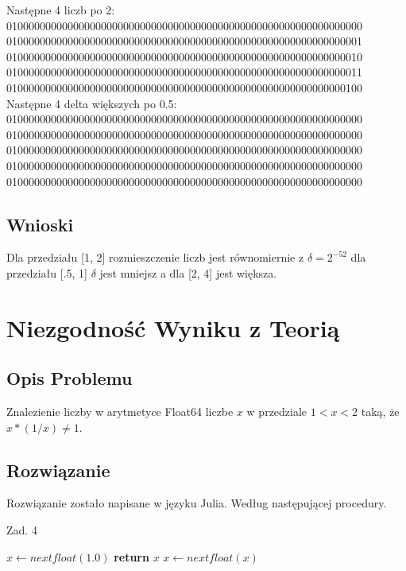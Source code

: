 \documentclass{article}
\begin{document}
Następne 4 liczb po 2:\\
0100000000000000000000000000000000000000000000000000000000000000\\
0100000000000000000000000000000000000000000000000000000000000001\\
0100000000000000000000000000000000000000000000000000000000000010\\
0100000000000000000000000000000000000000000000000000000000000011\\
0100000000000000000000000000000000000000000000000000000000000100\\
Następne 4 delta większych po 0.5:\\
0100000000000000000000000000000000000000000000000000000000000000\\
0100000000000000000000000000000000000000000000000000000000000000\\
0100000000000000000000000000000000000000000000000000000000000000\\
0100000000000000000000000000000000000000000000000000000000000000\\
0100000000000000000000000000000000000000000000000000000000000000\\
\subsection{Wnioski}
Dla przedziału [1, 2] rozmieszczenie liczb jest równomiernie z $\delta=2^{-52}$ dla przedziału [.5, 1] $\delta$ jest mniejsz a dla [2, 4] jest większa.
\section{Niezgodność Wyniku z Teorią}
\subsection{Opis Problemu}
    Znalezienie liczby w arytmetyce Float64 liczbe $x$ w przedziale $1<x<2$ taką, że $x*(1/x) \neq 1$.
\subsection{Rozwiązanie}
    Rozwiązanie zostało napisane w języku Julia. Według następującej procedury.
    \begin{algorithm}
    \caption{Zad. 4}\label{alg:cap}
    \begin{algorithmic}
        \State $x \gets nextfloat(1.0)$
                \State \textbf{return} $x$
            \EndIf
            \State $x \gets nextfloat(x)$
        \EndWhile
    \end{algorithmic}
    \end{algorithm}
\end{document}
